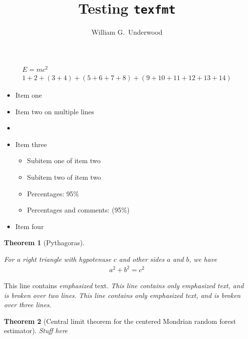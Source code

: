 \documentclass{article}
\title{Testing \texttt{texfmt}}
\author{William G.\ Underwood}
\newtheorem{theorem}{Theorem}
\begin{document}
\maketitle

\begin{align}
  E = m c^2 \\
  1 + 2
  + (3 + 4)
  + (5 + 6
  + 7 + 8)
  + (9 + 10
  + 11 + 12
  + 13 + 14)
\end{align}

\begin{itemize}
  \item Item one %
  \item Item two on
    multiple lines
  \item
  \item Item three
    \begin{itemize}
      \item Subitem one of item two
      \item Subitem two of item two
      \item Percentages: 95\%
      \item Percentages and comments: (95\%) %
    \end{itemize}
  \item Item four %
\end{itemize}

\begin{theorem}[Pythagoras]%
  \label{thm:pythagoras}

  For a right triangle with hypotenuse $c$ and other sides $a$ and $b$,
  we have
  \begin{align*}
    a^2 + b^2 = c^2
  \end{align*}

\end{theorem}

This line contains \emph{emphasized} text.
\emph{This line contains only emphasized text,
  and is broken over two lines}.
\emph{This line contains only
  emphasized text,
  and is broken over three lines}.

\begin{theorem}[Central limit theorem for the centered
    Mondrian random forest estimator]%
  \label{thm:clt}
  Stuff here
\end{theorem}
\end{document}
